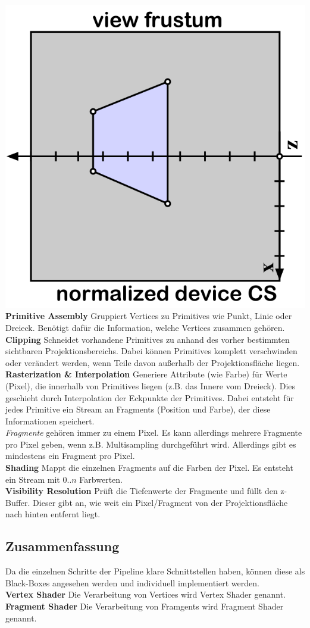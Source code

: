 \documentclass[12pt]{article}
\begin{document}
	\includegraphics[width=0.5\linewidth]{figures/rasterization-projection2.png}\\
	\textbf{Primitive Assembly} Gruppiert Vertices zu Primitives wie Punkt, Linie oder Dreieck. Benötigt dafür die Information, welche Vertices zusammen gehören.\\
	\textbf{Clipping} Schneidet vorhandene Primitives zu anhand des vorher bestimmten sichtbaren Projektionsbereichs. Dabei können Primitives komplett verschwinden oder verändert werden, wenn Teile davon außerhalb der Projektionsfläche liegen.\\
	\textbf{Rasterization \& Interpolation} Generiere Attribute (wie Farbe) für Werte (Pixel), die innerhalb von Primitives liegen (z.B. das Innere vom Dreieck). Dies geschieht durch Interpolation der Eckpunkte der Primitives. Dabei entsteht für jedes Primitive ein Stream an Fragments (Position und Farbe), der diese Informationen speichert.\\
	\textit{Fragmente} gehören immer zu einem Pixel. Es kann allerdings mehrere Fragmente pro Pixel geben, wenn z.B. Multisampling durchgeführt wird. Allerdings gibt es mindestens ein Fragment pro Pixel.\\
	\textbf{Shading} Mappt die einzelnen Fragments auf die Farben der Pixel. Es entsteht ein Stream mit $0..n$ Farbwerten.\\
	\textbf{Visibility Resolution} Prüft die Tiefenwerte der Fragmente und füllt den z-Buffer. Dieser gibt an, wie weit ein Pixel/Fragment von der Projektionsfläche nach hinten entfernt liegt.

	\subsection{Zusammenfassung}
	Da die einzelnen Schritte der Pipeline klare Schnittstellen haben, können diese als Black-Boxes angesehen werden und individuell implementiert werden.\\
	\textbf{Vertex Shader} Die Verarbeitung von Vertices wird Vertex Shader genannt.\\
	\textbf{Fragment Shader} Die Verarbeitung von Framgents wird Fragment Shader genannt.
\end{document}
